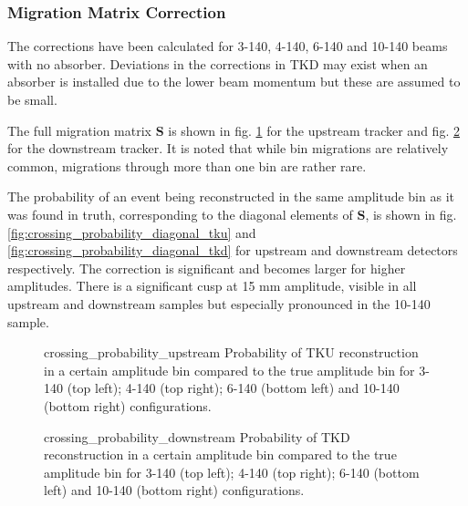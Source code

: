 \subsubsection{Migration Matrix Correction}

The corrections have been calculated for 3-140, 4-140, 6-140 and 10-140 beams
with no absorber. Deviations in the corrections in TKD may exist when an 
absorber is installed due to the lower beam momentum but these are assumed to be 
small.

The full migration matrix $\mathbf{S}$ is shown in fig. 
\ref{fig:crossing_probability_tku} for the upstream tracker and fig. 
\ref{fig:crossing_probability_tkd} for the downstream tracker. It is noted that 
while bin migrations are relatively common, migrations through more than one bin
are rather rare.

The probability of an event being reconstructed in the same amplitude bin as it
was found in truth, corresponding to the diagonal elements of $\mathbf{S}$, is
shown in fig. \ref{fig:crossing_probability_diagonal_tku} and 
\ref{fig:crossing_probability_diagonal_tkd} for upstream and downstream detectors
respectively. The correction is significant and becomes larger for
higher amplitudes. There is a significant cusp at 15 mm amplitude, visible
in all upstream and downstream samples but especially pronounced in the 10-140 
sample.

\begin{figure}[!tbh]
                     {crossing_probability_upstream}
                     {Probability of TKU reconstruction in a certain amplitude 
                      bin compared to the true amplitude bin for 3-140 (top 
                      left); 4-140 (top right); 6-140 (bottom left) and 10-140 
                      (bottom right) configurations.
                      \label{fig:crossing_probability_tku}}
\end{figure}

\begin{figure}[!tbh]
                     {crossing_probability_downstream}
            {Probability of TKD reconstruction in a certain amplitude bin compared 
             to the true amplitude bin for 3-140 (top left); 4-140 (top right); 
             6-140 (bottom left) and 10-140 (bottom right) configurations.
             \label{fig:crossing_probability_tkd}}
\end{figure}

